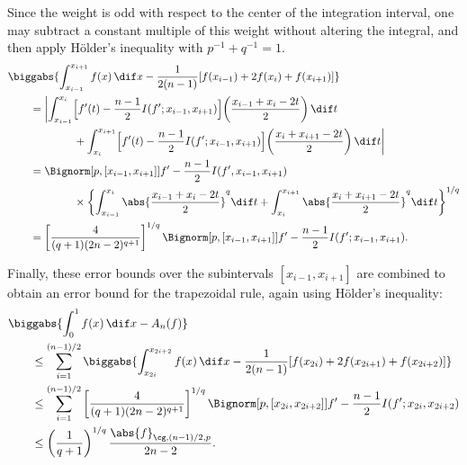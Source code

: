 \documentclass[final]{elsarticle}
\newcommand{\Gnorm}[3]{\abs{#3}_{\cg,#2,#1}}
\theoremstyle{definition}
\theoremstyle{remark}
\begin{document}
Since the weight is odd with respect to the center of the integration interval, one may subtract a constant multiple of this weight without altering the integral, and then apply H\"older's inequality with $p^{-1}+q^{-1}=1$.
\begin{align*}
\MoveEqLeft{\biggabs{\int_{x_{i-1}}^{x_{i+1}} f(x) \, \dif x - \frac{1}{2(n-1)} [f(x_{i-1}) + 2f(x_{i}) + f(x_{i+1}) ]}}\\
&=\biggl \lvert \int_{x_{i-1}}^{x_{i}} \Bigl[f'(t)-\frac{n-1}{2}I(f';x_{i-1},x_{i+1}) \Bigr] \biggl ( \frac{x_{i-1}+x_{i}-2t}{2} \biggr ) \, \dif t \\
& \qquad \qquad + \int_{x_{i}}^{x_{i+1}} \Bigl[f'(t)-\frac{n-1}{2}I(f';x_{i-1},x_{i+1}) \Bigr] \biggl ( \frac{x_{i}+x_{i+1}-2t}{2} \biggr ) \, \dif t\biggr \rvert \\
&=\Bignorm[p,{[x_{i-1},x_{i+1}]}]{f'-\frac{n-1}{2}I(f',x_{i-1},x_{i+1})} \\
&\qquad \qquad \times \biggl\{ \int_{x_{i-1}}^{x_{i}}\abs{\frac{x_{i-1}+x_{i}-2t}{2}}^q \dif t + \int_{x_{i}}^{x_{i+1}}\abs{\frac{x_{i}+x_{i+1}-2t}{2}}^q \dif t \biggr\}^{1/q}
\\ 
&=\left[\frac{4}{(q+1)(2n-2)^{q+1}} \right]^{1/q} \Bignorm[p,{[x_{i-1},x_{i+1}]}]{f'-\frac{n-1}{2}I(f';x_{i-1},x_{i+1})}.
\end{align*}

Finally, these error bounds over the subintervals $[x_{i-1},x_{i+1}]$ are combined to obtain an error bound for the trapezoidal rule, again using H\"older's inequality:
\begin{align*}
\MoveEqLeft{\biggabs{\int_{0}^{1} f(x) \, \dif x - A_n(f)}} \\
& \le \sum_{i=1}^{(n-1)/2}\biggabs{\int_{x_{2i}}^{x_{2i+2}} f(x) \, \dif x - \frac{1}{2(n-1)} [f(x_{2i}) + 2f(x_{2i+1}) + f(x_{2i+2}) ]} \\
& \le \sum_{i=1}^{(n-1)/2}\left[\frac{4}{(q+1)(2n-2)^{q+1}} \right]^{1/q} \Bignorm[p,{[x_{2i},x_{2i+2}]}]{f'-\frac{n-1}{2}I(f';x_{2i},x_{2i+2})} \\
& \le  \left(\frac{1}{q+1}\right)^{1/q} \frac{\Gnorm{p}{(n-1)/2}{f}}{2n-2} .
\end{align*}



\end{document}
